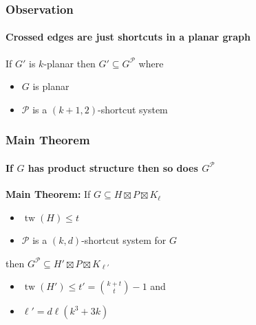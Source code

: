\documentclass[xcolor=dvipsnames]{beamer}
\DeclareMathOperator{\tw}{tw}
\begin{document}
\begin{frame}
    \frametitle{Observation}
    \framesubtitle{Crossed edges are just shortcuts in a planar graph}

    If $G'$ is $k$-planar then $G'\subseteq G^{\mathcal{P}}$ where
    \begin{itemize}
        \item $G$ is planar
        \item $\mathcal{P}$ is a $(k+1,2)$-shortcut system
    \end{itemize}
    \begin{center}
    \end{center}
\end{frame}

\begin{frame}
  \frametitle{Main Theorem}
  \framesubtitle{If $G$ has product structure then so does $G^{\mathcal{P}}$}
  \textbf{Main Theorem:} \newline
  If $G\subseteq H\boxtimes P\boxtimes K_\ell$
  \begin{itemize}
    \item  $\tw(H)\le t$
    \item $\mathcal{P}$ is a $(k,d)$-shortcut system for $G$
  \end{itemize}
  then $G^\mathcal{P}\subseteq H'\boxtimes P\boxtimes K_{\ell'}$
  \begin{itemize}
    \item $\tw(H') \le t'=\binom{k+t}{t}-1$ and
    \item $\ell'=d\ell(k^3+3k)$
  \end{itemize}
  \vspace{1cm}
\end{frame}
\end{document}
